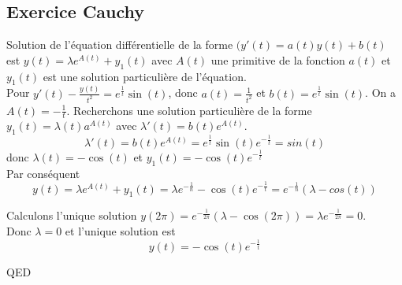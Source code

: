 \documentclass[]{book}
\theoremstyle{definition}
\begin{document}
\newpage
\subsection*{Exercice Cauchy}
Solution de l'\'equation diff\'erentielle de la forme $(y'(t) = a(t)y(t) + b(t)$ est $y(t) = \lambda e^{A(t)}+y_1(t)$ avec $A(t)$ une primitive de la fonction $a(t)$ et $y_1(t)$ est une solution particuli\`ere de l'\'equation.\\

Pour $y'(t) - \frac{y(t)}{t^2} = e^{\frac{1}{t}}\sin(t)$, donc $a(t) = \frac{1}{t^2}$ et $b(t)= e^{\frac{1}{t}}\sin(t)$. On a $A(t) = -\frac{1}{t}$. Recherchons une  solution particuli\`ere de la forme $y_1(t) = \lambda(t)a^{A(t)}$ avec $\lambda'(t) = b(t)e^{A(t)}$.
$$\lambda'(t) = b(t)e^{A(t)} = e^{\frac{1}{t}}\sin(t)e^{-\frac{1}{t}} = sin(t)$$
donc $\lambda(t) =  -\cos(t)$ et $y_1(t) = -\cos(t)e^{-\frac{1}{t}}$\\
Par cons\'equent
$$y(t) = \lambda e^{A(t)}+y_1(t) = \lambda e^{-\frac{1}{n}} -\cos(t)e^{-\frac{1}{t}} = e^{-\frac{1}{n}}(\lambda-cos(t))$$

Calculons l'unique solution $y(2\pi) =  e^{-\frac{1}{2\pi}}(\lambda-\cos(2\pi)) = \lambda e^{-\frac{1}{2\pi}} = 0$.\\
Donc $\lambda = 0$ et l'unique solution est 
$$y(t) = -\cos(t)e^{-\frac{1}{t}}$$


QED
\end{document}
